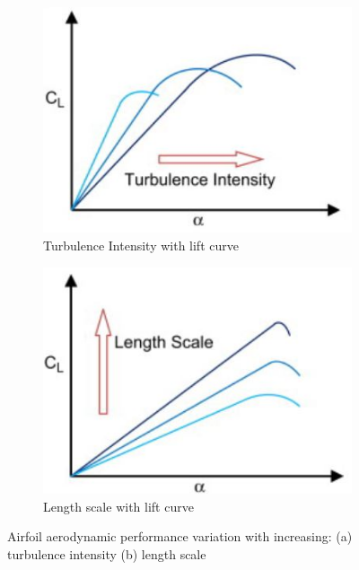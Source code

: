 \begin{figure}[H]
     \centering
     \begin{subfigure}[b]{0.45\textwidth}
         \centering
         \includegraphics[width=\textwidth]{03_LiteratureReview/Figs/acondition.JPG}
         \caption{Turbulence Intensity with lift curve}
         \label{fig:P2a}
     \end{subfigure}
     \hfill
     \begin{subfigure}[b]{0.45\textwidth}
         \centering
         \includegraphics[width=\textwidth]{03_LiteratureReview/Figs/bcondition.JPG}
         \caption{Length scale with lift curve}
         \label{fig:P2b}
     \end{subfigure}
     \hfill
          \caption{Airfoil aerodynamic performance variation with increasing: (a) turbulence intensity (b) length scale \cite{Mohamed2014}}
        \label{fig:flow}
\end{figure}





